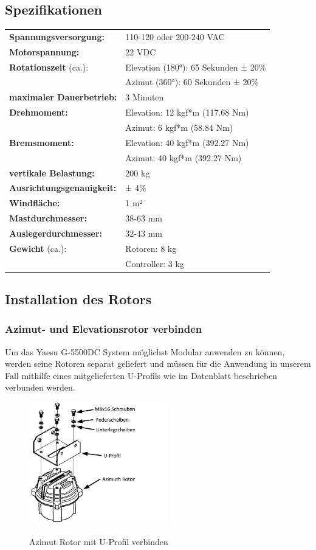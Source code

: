 \subsection{Spezifikationen}
\begin{tabular}{ l l }
	\textbf{Spannungsversorgung:} & 110-120 oder 200-240 VAC \\ 
	\textbf{Motorspannung:} & 22 VDC \\ 
	\textbf{Rotationszeit} (ca.): & Elevation (180°): 65 Sekunden ± 20\% \\
	& Azimut (360°): 60 Sekunden ± 20\% \\
	\textbf{maximaler Dauerbetrieb:} & 3 Minuten \\
	\textbf{Drehmoment:} & Elevation: 12 kgf*m (117.68 Nm)\\
	& Azimut: 6 kgf*m (58.84 Nm)\\
	\textbf{Bremsmoment:} & Elevation: 40 kgf*m (392.27 Nm) \\ &
	Azimut: 40 kgf*m (392.27 Nm) \\
	\textbf{vertikale Belastung:} & 200 kg \\
	\textbf{Ausrichtungsgenauigkeit:} & ± 4\% \\
	\textbf{Windfläche:} & 1 m²\\
	\textbf{Mastdurchmesser:} & 38-63 mm \\
	\textbf{Auslegerdurchmesser:} & 32-43 mm \\
	\textbf{Gewicht} (ca.): & Rotoren: 8 kg \\
	& Controller: 3 kg
\end{tabular}

\subsection{Installation des Rotors}
\subsubsection{Azimut- und Elevationsrotor verbinden}
Um das Yaesu G-5500DC System möglichst Modular anwenden zu können, werden seine Rotoren separat geliefert und müssen für die Anwendung in unserem Fall mithilfe eines mitgelieferten U-Profils wie im Datenblatt beschrieben verbunden werden.

\begin{figure}[H]
	\cite{noauthor_yaesu_nodate}
	\centering
	\includegraphics[width=6cm]{../ref/RotorInstallationAzimut.png}
	\label{fig:Rotor_Installation_Azimut_U-Bracket}
	\caption{Azimut Rotor mit U-Profil verbinden}
\end{figure}

